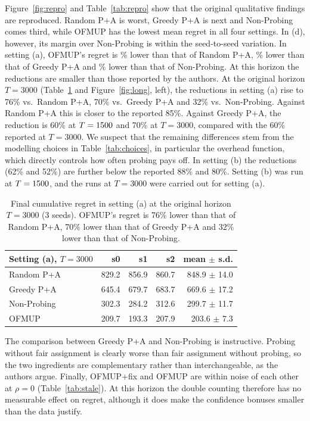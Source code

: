 \documentclass[letterpaper]{article}
\begin{document}
Figure~\ref{fig:repro} and Table~\ref{tab:repro} show that the original
qualitative findings are reproduced. Random P+A is worst, Greedy P+A is next and
Non-Probing comes third, while OFMUP has the lowest mean regret in all four
settings. In (d), however, its margin over Non-Probing is within the
seed-to-seed variation. In setting (a), OFMUP's regret is \RedRandA\% lower than
that of Random P+A, \RedGPA\% lower than that of Greedy P+A and \RedNPA\% lower
than that of Non-Probing. At this horizon the reductions are smaller than those
reported by the authors. At the original horizon $T=3000$
(Table~\ref{tab:repro3000} and Figure~\ref{fig:long}, left), the reductions in
setting (a) rise to 76\% vs.\ Random P+A, 70\% vs.\ Greedy P+A and 32\% vs.\
Non-Probing. Against Random P+A this is closer to the reported 85\%. Against
Greedy P+A, the reduction is 60\% at $T=1500$ and 70\% at $T=3000$, compared with
the 60\% reported at $T=3000$. We suspect that the remaining differences stem
from the modelling choices in Table~\ref{tab:choices}, in particular the
overhead function, which directly controls how often probing pays off. In
setting (b) the reductions (62\% and 52\%) are further below the reported 88\%
and 80\%. Setting (b) was run at $T=1500$, and the runs at $T=3000$ were carried
out for setting (a).

\begin{table}[t]
\caption{Final cumulative regret in setting (a) at the original horizon $T=3000$ (3 seeds). OFMUP's regret is 76\% lower than that of Random P+A, 70\% lower than that of Greedy P+A and 32\% lower than that of Non-Probing.}
\label{tab:repro3000}
\centering\footnotesize\setlength{\tabcolsep}{4pt}
\begin{tabular}{lrrrr}
\toprule
Setting (a), $T=3000$ & s0 & s1 & s2 & mean $\pm$ s.d. \\
\midrule
Random P+A & 829.2 & 856.9 & 860.7 & 848.9 $\pm$ 14.0 \\
Greedy P+A & 645.4 & 679.7 & 683.7 & 669.6 $\pm$ 17.2 \\
Non-Probing & 302.3 & 284.2 & 312.6 & 299.7 $\pm$ 11.7 \\
OFMUP & 209.7 & 193.3 & 207.9 & 203.6 $\pm$ 7.3 \\
\bottomrule
\end{tabular}
\end{table}

The comparison between Greedy P+A and Non-Probing is instructive. Probing
without fair assignment is clearly worse than fair assignment without probing,
so the two ingredients are complementary rather than interchangeable, as the
authors argue. Finally, OFMUP+fix and OFMUP are within noise of each other at
$\rho=0$ (Table~\ref{tab:stale}). At this horizon the double counting therefore
has no measurable effect on regret, although it does make the confidence
bonuses smaller than the data justify.
\end{document}
